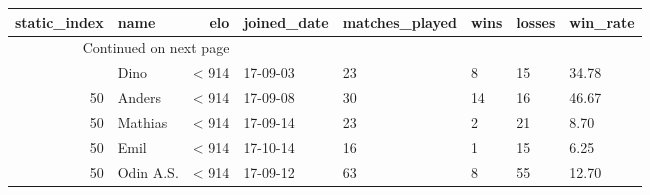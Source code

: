 \begin{longtable}{|r|l|r|l|l|l|l|l|}
\toprule
 static\_index &       name &    elo & joined\_date &  matches\_played &  wins &  losses &  win\_rate \\
\midrule
\endhead
\midrule
\multicolumn{3}{r}{{Continued on next page}} \\
\midrule
\endfoot

\bottomrule
\endlastfoot
           50 &       Dino &  < 914 &    17-09-03 &              23 &     8 &      15 &     34.78 \\
           50 &     Anders &  < 914 &    17-09-08 &              30 &    14 &      16 &     46.67 \\
           50 &    Mathias &  < 914 &    17-09-14 &              23 &     2 &      21 &      8.70 \\
           50 &       Emil &  < 914 &    17-10-14 &              16 &     1 &      15 &      6.25 \\
           50 &  Odin A.S. &  < 914 &    17-09-12 &              63 &     8 &      55 &     12.70 \\
\end{longtable}
